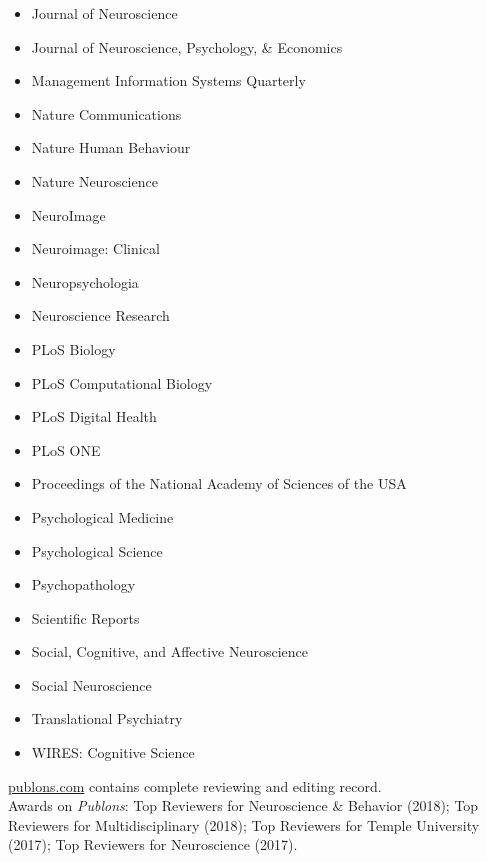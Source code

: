 \documentclass[11pt, letterpaper]{article}
\begin{document}
\begin{multicols}{2}
\begin{itemize}[noitemsep]
\item Journal of Neuroscience 
\item Journal of Neuroscience, Psychology, \& Economics
\item Management Information Systems Quarterly 
\item Nature Communications 
\item Nature Human Behaviour 
\item Nature Neuroscience
\item NeuroImage 
\item Neuroimage: Clinical 
\item Neuropsychologia 
\item Neuroscience Research 
\item PLoS Biology 
\item PLoS Computational Biology 
\item PLoS Digital Health 
\item PLoS ONE 
\item Proceedings of the National Academy of Sciences of the USA
\item Psychological Medicine 
\item Psychological Science 
\item Psychopathology 
\item Scientific Reports 
\item Social, Cognitive, and Affective Neuroscience 
\item Social Neuroscience
\item Translational Psychiatry
\item WIRES: Cognitive Science
\end{itemize}
\end{multicols}

\aiPublons \hspace{.05cm} \href{https://publons.com/author/1204254/david-v-smith}{publons.com} contains complete reviewing and editing record. \\ [.2cm]
Awards on \textit{Publons}: Top Reviewers for Neuroscience \& Behavior (2018); Top Reviewers for Multidisciplinary (2018); Top Reviewers for Temple University (2017); Top Reviewers for Neuroscience (2017).
\end{document}
